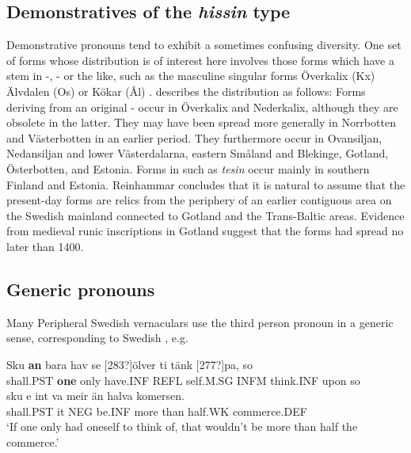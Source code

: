 
\subsection{Demonstratives of the \textit{hissin} type}

Demonstrative pronouns tend to exhibit a sometimes confusing diversity. One set of forms whose distribution is of interest here involves those forms which have a stem in -, - or the like, such as the masculine singular forms Överkalix (Kx) Älvdalen (Os) or Kökar (Ål) . \citet{Reinhammar1988} describes the distribution as follows: Forms deriving from an original - occur in Överkalix and Nederkalix, although they are obsolete in the latter. They may have been spread more  generally in Norrbotten and Västerbotten in an earlier period. They furthermore occur in Ovansiljan, Nedansiljan and lower Västerdalarna, eastern Småland and Blekinge, Gotland, Österbotten, and Estonia. Forms in  such as \textit{tesin} occur mainly in southern Finland and Estonia. Reinhammar concludes that it is natural to assume that the present-day forms are relics from the periphery of an earlier contiguous area on the Swedish mainland connected to Gotland and the Trans-Baltic areas. Evidence from medieval runic inscriptions in Gotland suggest that the forms had spread no later than 1400.


\subsection{Generic pronouns}

Many Peripheral Swedish vernaculars use the third person pronoun  in a generic sense, corresponding to Swedish , e.g.


\ea\label{}
\gll Sku  \textbf{an} bara  hav  se  [283?]ölver  ti  tänk  [277?]pa,  so\\
shall.PST  \textbf{one} only  have.INF  REFL  self.M.SG  INFM  think.INF  upon  so\\
\gll sku  e  int  va  meir  än  halva  komersen.\\
shall.PST   it  NEG  be.INF  more  than  half.WK  commerce.DEF\\
\glt ‘If one only had oneself to think of, that wouldn’t be more than half the commerce.’
\z

